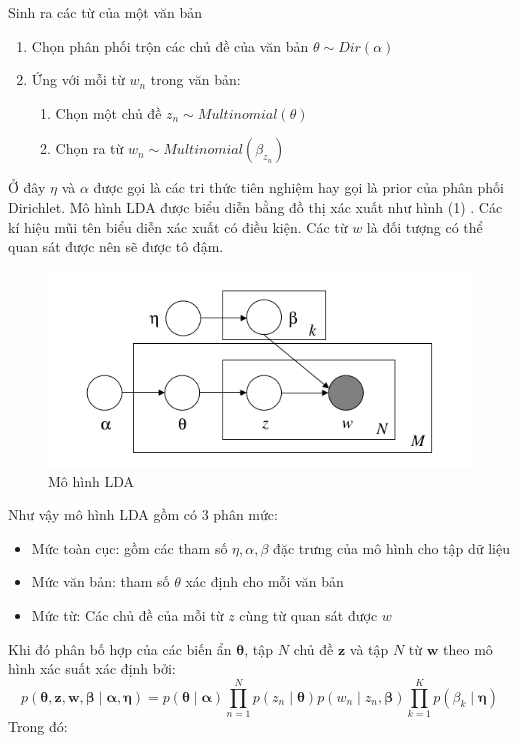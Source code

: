\documentclass[fontsize=13pt]{scrartcl}
\begin{document}
Sinh ra các từ của một văn bản
\begin{enumerate}
\item Chọn phân phối trộn các chủ đề của văn bản $\theta \sim Dir(\alpha)$
\item  Ứng với mỗi từ $w_n$ trong văn bản:
\begin{enumerate}
\item Chọn một chủ đề $z_n \sim Multinomial(\theta)$
\item Chọn ra từ $w_n \sim Multinomial(\beta_{z_{n}})$
\end{enumerate}
\end{enumerate}
Ở đây $\eta$ và $\alpha$ được gọi là các tri thức tiên nghiệm hay gọi là prior của phân phối Dirichlet. Mô hình LDA được biểu diễn bằng đồ thị xác xuất như hình (1) . Các kí hiệu mũi tên biểu diễn xác xuất có điều kiện. Các từ $w$ là đối tượng có thể quan sát được nên sẽ được tô đậm.
\begin{figure}[h]
\label{fig:ldaFull}
\begin{center}
\includegraphics[scale=0.5]{img/lda_full.png}
\end{center}
\caption{Mô hình LDA}
\end{figure}
Như vậy mô hình LDA gồm có 3 phân mức: 
\begin{itemize}
\item Mức toàn cục: gồm các tham số $\eta, \alpha, \beta$ đặc trưng của mô hình cho tập dữ liệu
\item Mức văn bản: tham số $\theta$ xác định cho mỗi văn bản
\item Mức từ: Các chủ đề của mỗi từ $z$ cùng từ quan sát được $w$
\end{itemize}

Khi đó phân bố hợp của các biến ẩn $\boldsymbol\theta$, tập $N$ chủ đề $\mathbf{z}$ và tập $N$ từ $\mathbf{w}$ theo mô hình xác suất xác định bởi:
\begin{equation}
p(\boldsymbol{\theta},\mathbf{z},\mathbf{w},\boldsymbol\beta \mid \boldsymbol\alpha,\boldsymbol\eta) = p(\boldsymbol{\theta}\mid \boldsymbol\alpha )\prod_{n=1}^{N}p(z_n \mid \boldsymbol{\theta})p(w_n \mid z_n,\boldsymbol\beta)\prod_{k=1}^{K}p(\beta_k\mid \boldsymbol\eta)
\end{equation}
Trong đó:
\end{document}
